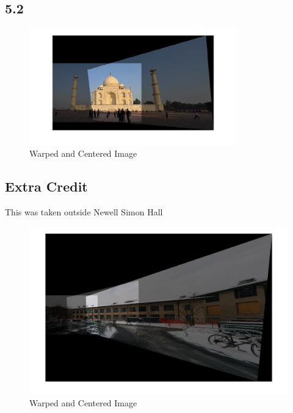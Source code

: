 \documentclass[11pt]{article}
\begin{document}
\subsection*{5.2}
\begin{figure}[H]
\centering
\includegraphics[width=90mm]{results/q5_2.jpg}
\caption{Warped and Centered Image}
\end{figure}
\subsection*{Extra Credit}
This was taken outside Newell Simon Hall
\begin{figure}[H]
\centering
\includegraphics[width=150mm]{results/ec_pan.jpg}
\caption{Warped and Centered Image}
\end{figure}
\end{document}
